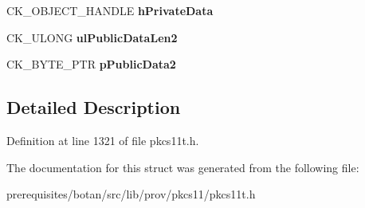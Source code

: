 \begin{DoxyCompactItemize}
\item 
\mbox{\label{struct_c_k___e_c_d_h2___d_e_r_i_v_e___p_a_r_a_m_s_a4fe0a769ab8dbec4bd9f3400bff1b181}} 
C\+K\+\_\+\+O\+B\+J\+E\+C\+T\+\_\+\+H\+A\+N\+D\+LE {\bfseries h\+Private\+Data}
\item 
\mbox{\label{struct_c_k___e_c_d_h2___d_e_r_i_v_e___p_a_r_a_m_s_a6bf8841549189850b62cdb4c81ae6bcb}} 
C\+K\+\_\+\+U\+L\+O\+NG {\bfseries ul\+Public\+Data\+Len2}
\item 
\mbox{\label{struct_c_k___e_c_d_h2___d_e_r_i_v_e___p_a_r_a_m_s_a61ca952359c19f29e7bb868bc136acd3}} 
C\+K\+\_\+\+B\+Y\+T\+E\+\_\+\+P\+TR {\bfseries p\+Public\+Data2}
\end{DoxyCompactItemize}


\subsection{Detailed Description}


Definition at line 1321 of file pkcs11t.\+h.



The documentation for this struct was generated from the following file\+:\begin{DoxyCompactItemize}
\item 
prerequisites/botan/src/lib/prov/pkcs11/pkcs11t.\+h\end{DoxyCompactItemize}
